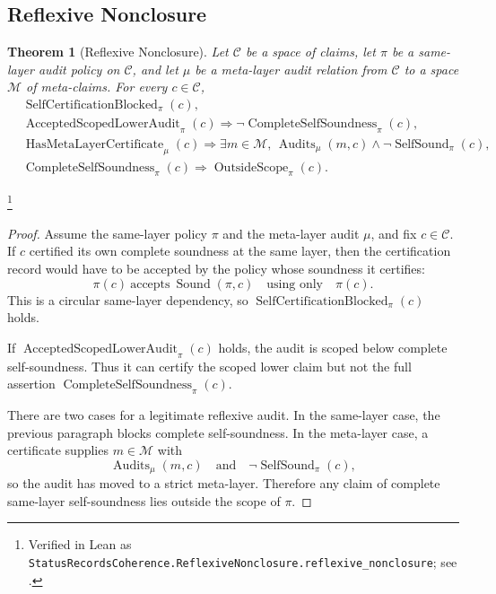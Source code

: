 \documentclass[11pt]{article}
\newtheorem{theorem}{Theorem}[section]
\theoremstyle{definition}
\begin{document}
\subsection{Reflexive Nonclosure}\label{sec:status-records-coherence:reflexive-nonclosure}

\begin{theorem}[Reflexive Nonclosure]\label{thm:F21}
Let \(\mathcal C\) be a space of claims, let
\(\pi\) be a same-layer audit policy on \(\mathcal C\), and let
\(\mu\) be a meta-layer audit relation from \(\mathcal C\) to a
space \(\mathcal M\) of meta-claims.  For every
\(c\in\mathcal C\),
\begin{align*}
  &\operatorname{SelfCertificationBlocked}_{\pi}(c),\\
  &\operatorname{AcceptedScopedLowerAudit}_{\pi}(c)
    \Longrightarrow
    \neg\operatorname{CompleteSelfSoundness}_{\pi}(c),\\
  &\operatorname{HasMetaLayerCertificate}_{\mu}(c)
    \Longrightarrow
    \exists m\in\mathcal M,\,
      \operatorname{Audits}_{\mu}(m,c)
      \wedge
      \neg\operatorname{SelfSound}_{\pi}(c),\\
  &\operatorname{CompleteSelfSoundness}_{\pi}(c)
    \Longrightarrow
    \operatorname{OutsideScope}_{\pi}(c).
\end{align*}
\end{theorem}
\footnote{\raggedright Verified in Lean as
\texttt{StatusRecordsCoherence.ReflexiveNonclosure.\allowbreak{}reflexive\_nonclosure};
see .}
\begin{proof}
Assume the same-layer policy \(\pi\) and the meta-layer audit
\(\mu\), and fix \(c\in\mathcal C\).  If \(c\) certified its own
complete soundness at the same layer, then the certification record
would have to be accepted by the policy whose soundness it certifies:
\[
  \pi(c)\ \text{accepts}\ \operatorname{Sound}(\pi,c)
  \quad\text{using only}\quad \pi(c).
\]
This is a circular same-layer dependency, so
\(\operatorname{SelfCertificationBlocked}_{\pi}(c)\) holds.

If \(\operatorname{AcceptedScopedLowerAudit}_{\pi}(c)\) holds, the
audit is scoped below complete self-soundness.  Thus it can certify
the scoped lower claim but not the full assertion
\(\operatorname{CompleteSelfSoundness}_{\pi}(c)\).

There are two cases for a legitimate reflexive audit.  In the
same-layer case, the previous paragraph blocks complete
self-soundness.  In the meta-layer case, a certificate supplies
\(m\in\mathcal M\) with
\[
  \operatorname{Audits}_{\mu}(m,c)
  \quad\text{and}\quad
  \neg\operatorname{SelfSound}_{\pi}(c),
\]
so the audit has moved to a strict meta-layer.  Therefore any claim
of complete same-layer self-soundness lies outside the scope of
\(\pi\).
\end{proof}
\end{document}
